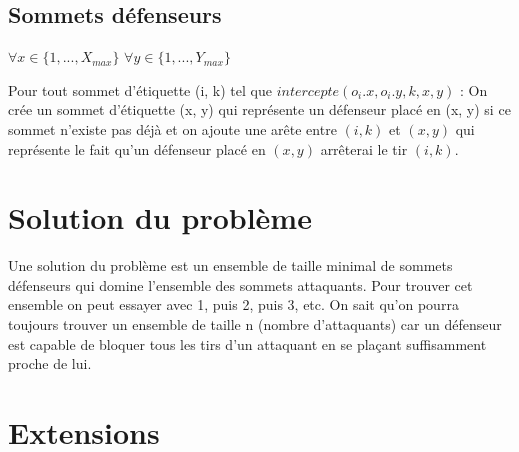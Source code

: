 \documentclass[12pt]{report}
\begin{document}
\section{Sommets défenseurs}
$\forall x \in \{1, ..., X_{max}\}$ $\forall y \in \{1, ..., Y_{max}\}$ 

Pour tout sommet d'étiquette (i, k) tel que $intercepte(o_i.x, o_i.y, k, x, y)$ : On crée un sommet d'étiquette (x, y) qui représente un défenseur placé en (x, y) si ce sommet n'existe pas déjà et on ajoute une arête entre $(i, k)$ et $(x, y)$ qui représente le fait qu'un défenseur placé en $(x, y)$ arrêterai le tir $(i, k)$.

\chapter{Solution du problème}
Une solution du problème est un ensemble de taille minimal de sommets défenseurs qui domine l'ensemble des sommets attaquants.
Pour trouver cet ensemble on peut essayer avec 1, puis 2, puis 3, etc. On sait qu'on pourra toujours trouver un ensemble de taille n (nombre d'attaquants) car un défenseur est capable de bloquer tous les tirs d'un attaquant en se plaçant suffisamment proche de lui. 

\chapter{Extensions}
\end{document}
